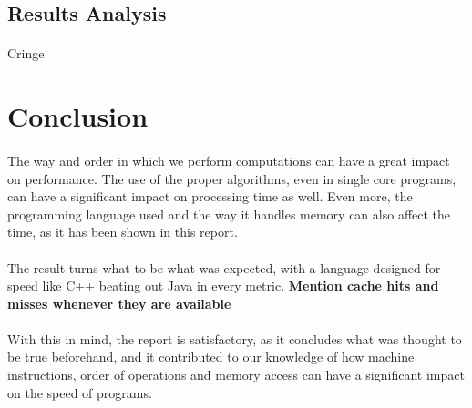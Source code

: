 \documentclass{report}
\begin{document}
    \subsection*{Results Analysis}

    \paragraph{}Cringe

    \section*{Conclusion}

    \paragraph{}The way and order in which we perform computations can have a great impact on performance. The use of the proper algorithms, even in single core programs, can have a significant impact on processing time as well. Even more, the programming language used and the way it handles memory can also affect the time, as it has been shown in this report.

    \paragraph{}The result turns what to be what was expected, with a language designed for speed like C++ beating out Java in every metric. \textbf{Mention cache hits and misses whenever they are available}

    \paragraph{}With this in mind, the report is satisfactory, as it concludes what was thought to be true beforehand, and it contributed to our knowledge of how machine instructions, order of operations and memory access can have a significant impact on the speed of programs.
\end{document}
